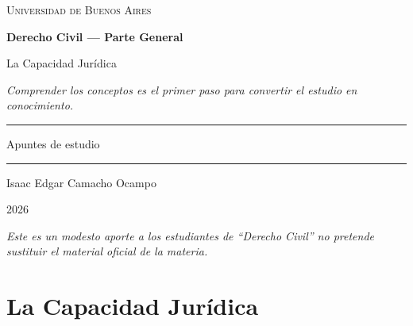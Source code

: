 \documentclass[12pt,oneside]{book}
\newcommand{\universidad}{Universidad de Buenos Aires}
\newcommand{\materia}{Derecho Civil --- Parte General}
\newcommand{\titulo}{La Capacidad Jurídica}
\newcommand{\autor}{Isaac Edgar Camacho Ocampo}
\newcommand{\anio}{2026}
\begin{document}
\begin{titlepage}
\thispagestyle{empty}

\begin{center}

\vspace*{1cm}

{\large \textsc{\universidad}}

\vspace{3cm}

{\Huge \textbf{\materia}}

\vspace{1cm}

{\LARGE \titulo}

\vspace{0.8cm}

\textit{Comprender los conceptos es el primer paso para convertir el estudio en conocimiento.}

\vspace{1.2cm}

\rule{0.70\textwidth}{0.5pt}

\vspace{0.5cm}

{\large Apuntes de estudio}

\vspace{0.5cm}

\rule{0.70\textwidth}{0.5pt}

\vfill

{\large \autor}

\vspace{0.3cm}

{\large \anio}

\end{center}

\vfill

\begin{flushleft}
\textit{Este es un modesto aporte a los estudiantes de ``Derecho Civil'' no pretende sustituir el material oficial de la materia.}
\end{flushleft}

\end{titlepage}

\tableofcontents
\clearpage

\chapter{La Capacidad Jurídica}
\end{document}
